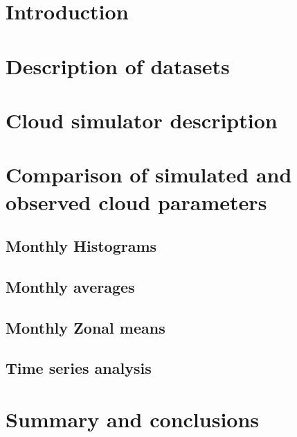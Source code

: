 \documentclass[a4paper,11pt]{article}
\begin{document}
\title{\doctitle}
\author{\docauthor}
\date{\today}
\maketitle
\tableofcontents


\newpage
\section{Introduction}\label{sec:intro}


\section{Description of datasets}\label{sec:datasets}


\section{Cloud simulator description}\label{sec:sim}



\section{Comparison of simulated and observed cloud parameters}\label{sec:sim_vs_obs}
\FloatBarrier
\subsection{Monthly Histograms}


\FloatBarrier
\subsection{Monthly averages}

\FloatBarrier
\subsection{Monthly Zonal means}

\FloatBarrier
\subsection{Time series analysis}


\section{Summary and conclusions}\label{sec:sum_and_con}


\newpage
{}

%
 
\end{document}
